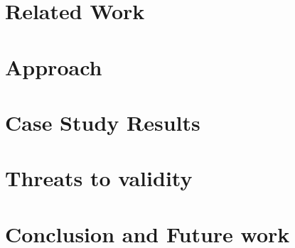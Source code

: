 \documentclass[conference]{IEEEtran}
\begin{document}
\section{Related Work}
\label{sec:related_work}


\section{Approach}
\label{sec:approach}


\section{Case Study Results}
\label{sec:results}


\section{Threats to validity}
\label{sec:threats_to_validity}


\section{Conclusion and Future work}
\label{sec:conclusion}



\balance

\end{document}
